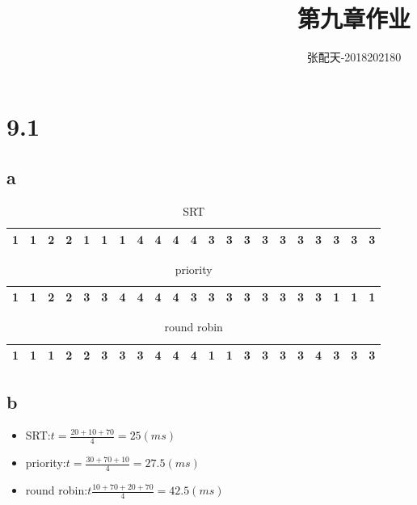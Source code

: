 \documentclass[UTF8]{ctexart}
\title{第九章作业}
\author{张配天-2018202180}
\begin{document}
    \maketitle
    \section*{9.1}
    \subsection*{a}
    \begin{table}[htb]
    \centering

        \begin{tabular}{|c|c|c|c|c|c|c|c|c|c|c|c|c|c|c|c|c|c|c|c|c|}
        \hline
        1&1&2&2&1&1&1&4&4&4&4&3&3&3&3&3&3&3&3&3&3\\
        \hline
        \end{tabular}
        \caption{SRT}

    \end{table}
    \begin{table}[htb]
    \centering
        \begin{tabular}{|c|c|c|c|c|c|c|c|c|c|c|c|c|c|c|c|c|c|c|c|c|}
        \hline
        1&1&2&2&3&3&4&4&4&4&3&3&3&3&3&3&3&3&1&1&1\\
        \hline    
        \end{tabular}
        \caption{priority}
    \end{table}
    \begin{table}[htb]
    \centering

        \begin{tabular}{|c|c|c|c|c|c|c|c|c|c|c|c|c|c|c|c|c|c|c|c|c|}
        \hline
        1&1&1&2&2&3&3&3&4&4&4&1&1&3&3&3&3&4&3&3&3\\
        \hline    
        \end{tabular}
        \caption{round robin}
    \end{table}
    \subsection*{b}
    \begin{itemize}
        \item SRT:$t = \frac{20 + 10 + 70 }{4}= 25(ms)$
        \item priority:$t = \frac{30+70+10}{4}= 27.5(ms)$
        \item round robin:$t \frac{10+70+20+70}{4} = 42.5(ms) $
    \end{itemize}
\end{document}
